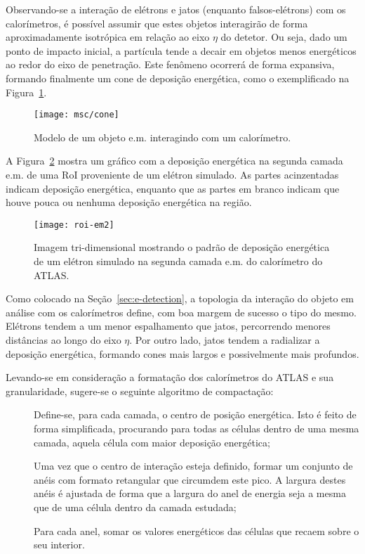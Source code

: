 Observando-se a interação de elétrons e jatos (enquanto falsos-elétrons) com
os calorímetros, é possível assumir que estes objetos interagirão de forma
aproximadamente isotrópica em relação ao eixo $\eta$ do detetor. Ou seja, dado
um ponto de impacto inicial, a partícula tende a decair em objetos menos
energéticos ao redor do eixo de penetração. Este fenômeno ocorrerá de forma
expansiva, formando finalmente um cone de deposição energética, como o
exemplificado na Figura~\ref{fig:cone}.

\begin{figure}
\begin{center}
\texttt{[image: msc/cone]}
\end{center}
\caption{Modelo de um objeto e.m. interagindo com um calorímetro.}
\label{fig:cone}
\end{figure}

A Figura~\ref{fig:electron-roi} mostra um gráfico com a deposição energética na
segunda camada e.m. de uma RoI proveniente de um elétron simulado. As partes
acinzentadas indicam deposição energética, enquanto que as partes em branco
indicam que houve pouca ou nenhuma deposição energética na região.

\begin{figure}
\begin{center}
\texttt{[image: roi-em2]}
\end{center}
\caption{Imagem tri-dimensional mostrando o padrão de deposição energética de
um elétron simulado na segunda camada e.m. do calorímetro do ATLAS.}
\label{fig:electron-roi}
\end{figure}

Como colocado na Seção~\ref{sec:e-detection}, a topologia da interação do
objeto em análise com os calorímetros define, com boa margem de sucesso o tipo
do mesmo. Elétrons tendem a um menor espalhamento que jatos, percorrendo
menores distâncias ao longo do eixo $\eta$. Por outro lado, jatos tendem a
radializar a deposição energética, formando cones mais largos e possivelmente
mais profundos.

Levando-se em consideração a formatação dos calorímetros do ATLAS e sua
granularidade, sugere-se o seguinte algoritmo de compactação:

\begin{description}
\item[] Define-se, para cada camada, o centro de posição
energética. Isto é feito de forma simplificada, procurando para todas as
células dentro de uma mesma camada, aquela célula com maior deposição
energética;
\item[] Uma vez que o centro de interação esteja definido, formar um
conjunto de anéis com formato retangular que circumdem este pico. A largura
destes anéis é ajustada de forma que a largura do anel de energia seja a mesma
que de uma célula dentro da camada estudada;
\item[] Para cada anel, somar os valores energéticos das células que
recaem sobre o seu interior.
\end{description}


